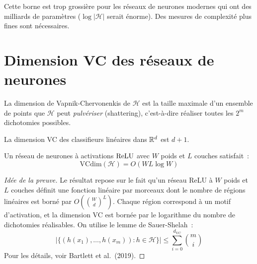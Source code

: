 \begin{remarque}
Cette borne est trop grossi\`ere pour les r\'eseaux de neurones modernes
qui ont des milliards de param\`etres ($\log|\mathcal{H}|$ serait \'enorme).
Des mesures de complexit\'e plus fines sont n\'ecessaires.
\end{remarque}

\section{Dimension VC des r\'eseaux de neurones}
\label{sec:vc-dimension}

\begin{definition}[Dimension VC]
\label{def:vc-dim}
La dimension de Vapnik-Chervonenkis de $\mathcal{H}$ est la taille maximale
d'un ensemble de points que $\mathcal{H}$ peut \emph{pulv\'eriser} (shattering),
c'est-\`a-dire r\'ealiser toutes les $2^m$ dichotomies possibles.
\end{definition}

\begin{proposition}
\label{prop:vc-linear}
La dimension VC des classifieurs lin\'eaires dans $\mathbb{R}^d$ est $d + 1$.
\end{proposition}

\begin{theoreme}
\label{thm:vc-relu}
Un r\'eseau de neurones \`a activations $\mathrm{ReLU}$ avec $W$ poids et $L$ couches
satisfait~:
\begin{equation}
\text{VCdim}(\mathcal{H}) = O(WL\log W)
\end{equation}
\end{theoreme}

\begin{proof}[Id\'ee de la preuve]
Le r\'esultat repose sur le fait qu'un r\'eseau ReLU \`a $W$ poids et $L$
couches d\'efinit une fonction lin\'eaire par morceaux dont le nombre de
r\'egions lin\'eaires est born\'e par $O\!\left(\binom{W}{d}^L\right)$.
Chaque r\'egion correspond \`a un motif d'activation, et la dimension VC
est born\'ee par le logarithme du nombre de dichotomies r\'ealisables.
On utilise le lemme de Sauer-Shelah~:
\begin{equation}
|\{(h(x_1), \ldots, h(x_m)) : h \in \mathcal{H}\}| \leq \sum_{i=0}^{d_{\text{VC}}} \binom{m}{i}
\end{equation}
Pour les d\'etails, voir Bartlett et al.\ (2019).
\end{proof}

